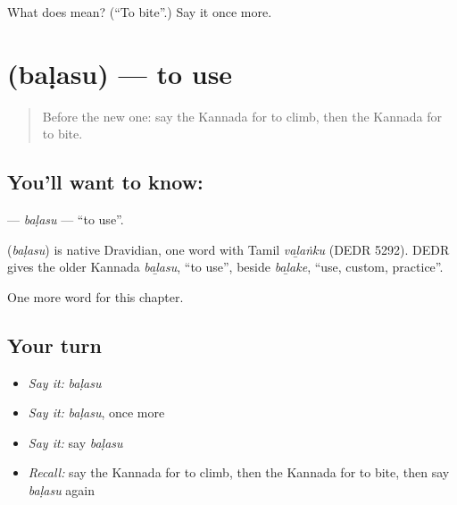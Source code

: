 \begin{tcolorbox}[breakable,colback=teal!4,colframe=teal!35!black,title={Before you move on}]
What does  mean? (\textquotedblleft{}To bite\textquotedblright{}.) Say it once more.
\end{tcolorbox}
\section[\texorpdfstring{\kn{ಬಳಸು} (baḷasu)}{ಬಳಸು (baḷasu)}]{ (baḷasu) — to use}

\label{lesson:KA-C237-balasu}



\begin{quote}
Before the new one: say the Kannada for to climb, then the Kannada for to bite.
\end{quote}

\subsection*{You'll want to know: }
\textbf{} — \emph{baḷasu} — \textquotedblleft{}to use\textquotedblright{}.

\begin{cousinweb}
\textbf{} (\emph{baḷasu}) is native Dravidian, one word with Tamil \emph{vaḻaṅku} (DEDR 5292). DEDR gives the older Kannada \emph{baḻasu}, \textquotedblleft{}to use\textquotedblright{}, beside \emph{baḻake}, \textquotedblleft{}use, custom, practice\textquotedblright{}.
\end{cousinweb}

\begin{grammarlens}[title={What you've built}]
One more word for this chapter.
\end{grammarlens}

\subsection*{Your turn}
\begin{itemize}
\raggedright
  \item \emph{Say it:} \emph{baḷasu}
  \item \emph{Say it:} \emph{baḷasu}, once more
  \item \emph{Say it:} say \emph{baḷasu}
  \item \emph{Recall:} say the Kannada for to climb, then the Kannada for to bite, then say \emph{baḷasu} again
\end{itemize}

